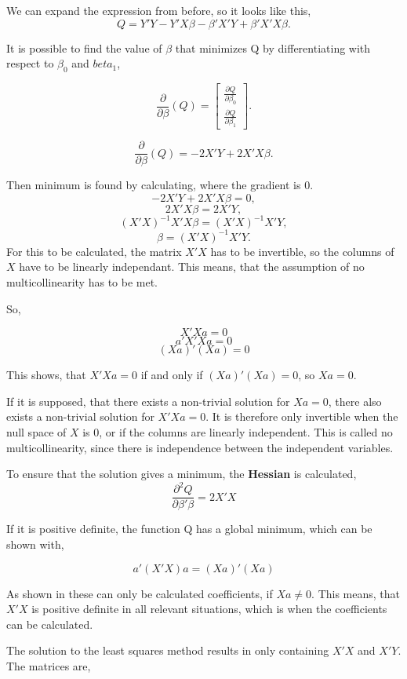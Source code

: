\noindent We can expand the expression from before, so it looks like this,
$$Q=Y' Y -Y' X \beta -\beta' X' Y + \beta' X' X \beta .$$


\noindent It is possible to find the value of $\beta$ that minimizes Q by differentiating with respect to $\beta_0$ and $beta_1$,

$$
\frac{\partial}{\partial \beta}(Q)=
\left[
\begin{array}{c}
	\frac{\partial Q}{\partial \beta_0}\\ 
	\frac{\partial Q}{\partial \beta_1}
\end{array}
\right].
$$

$$
\frac{\partial}{\partial \beta}(Q)=-2 X' Y + 2X' X \beta .$$

\noindent Then minimum is found by calculating, where the gradient is 0.
$$-2 X' Y+ 2X' X \beta =0,$$
$$ 2X' X \beta = 2X' Y,$$
$$(X' X)^{-1} X' X \beta = (X' X)^{-1} X' Y,$$
$$ \beta=(X' X)^{-1} X' Y.$$
  For this to be calculated, the matrix $X' X$ has to be invertible, so the columns of $X$ have to be linearly independant.
 This means, that the assumption of no multicollinearity has to be met.
 
 \noindent So, 
 
 $$X' Xa  =0$$
 $$ a' X' X a =0$$
 $$(Xa)'(Xa)=0$$
 
 \noindent This shows, that $X'Xa=0$ if and only if $(Xa)'(Xa)=0$, so $Xa=0$. 
 
 \noindent If it is supposed, that there exists a non-trivial solution for $Xa=0$, there also exists a non-trivial solution for $X'Xa=0$. It is therefore only invertible when the null space of $X$ is 0, or if the columns are linearly independent. This is called no multicollinearity, since there is independence between the independent variables. 
 
\noindent To ensure that the solution gives a minimum, the \textbf{Hessian} is calculated,
 $$\frac{\partial^2 Q}{\partial \beta' \beta}=2X'X$$
 
 \noindent If it is positive definite, the function Q has a global minimum, which can be shown with,
 
 $$a' (X' X)a = (Xa)' (Xa)$$
 
 \noindent As shown in %
 these can only be calculated coefficients, if $Xa \not= 0$. This means, that $X'X$ is positive definite in all relevant situations, which is when the coefficients can be calculated. 
 
 \noindent The solution to the least squares method results in only containing $X'X$ and $X'Y$.
 The matrices are,
 
